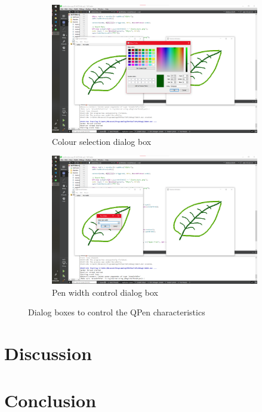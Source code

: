 \documentclass[10pt]{article}
\newcommand{\figsquish}{\vspace{-5mm}} %
\begin{document}
\begin{multicols*}{2}
\begin{figure}[H]
\begin{subfigure}[t]{0.48\columnwidth}
		\includegraphics[width=\columnwidth]{./colour.png}
		\caption{Colour selection dialog box}
		\label{fig:colour}
	\end{subfigure}
	\hfill
	\begin{subfigure}[t]{0.48\columnwidth}

		\includegraphics[width=\columnwidth]{./width.png}
		\caption{Pen width control dialog box}
		\label{fig:width}
	\end{subfigure}
	\caption{Dialog boxes to control the QPen characteristics}
	\label{fig:drawDialogs}
\end{figure}
\figsquish


\section{Discussion}

\section{Conclusion}


\nocite{*} %



\end{multicols*}
\end{document}
